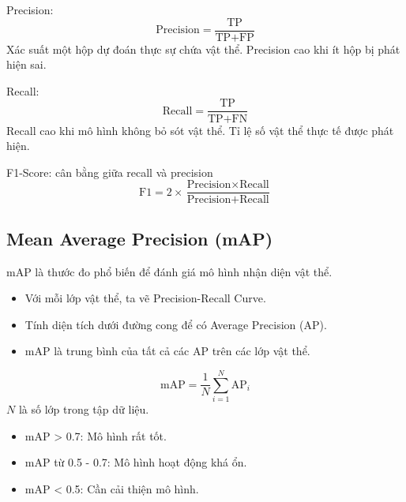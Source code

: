 \documentclass{article}
\begin{document}
Precision:
\[
\text{Precision} = \frac{\text{TP}}{\text{TP} + \text{FP}}
\]
Xác suất một hộp dự đoán thực sự chứa vật thể. Precision cao khi ít hộp bị phát hiện sai.

Recall:
\[
\text{Recall} = \frac{\text{TP}}{\text{TP} + \text{FN}}
\]
Recall cao khi mô hình không bỏ sót vật thể. Tỉ lệ số vật thể thực tế được phát hiện.

F1-Score: cân bằng giữa recall và precision
\[
\text{F1} = 2 \times \frac{\text{Precision} \times \text{Recall}}{\text{Precision} + \text{Recall}}
\]

\subsection{Mean Average Precision (mAP)}
mAP là thước đo phổ biến để đánh giá mô hình nhận diện vật thể.
\begin{itemize}
    \item Với mỗi lớp vật thể, ta vẽ Precision-Recall Curve.
    \item Tính diện tích dưới đường cong để có Average Precision (AP).
    \item mAP là trung bình của tất cả các AP trên các lớp vật thể.
\end{itemize}
\[
\text{mAP} = \frac{1}{N} \sum_{i=1}^{N} \text{AP}_i
\]
$N$ là số lớp trong tập dữ liệu.
\begin{itemize}
    \item mAP > 0.7: Mô hình rất tốt.
    \item mAP từ 0.5 - 0.7: Mô hình hoạt động khá ổn.
    \item mAP < 0.5: Cần cải thiện mô hình.
\end{itemize}

\end{document}
